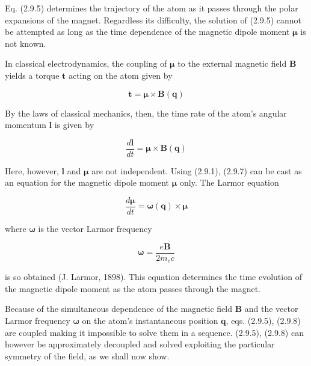 \documentclass{article}
\begin{document}
Eq. (2.9.5) determines the trajectory of the atom as it passes through the polar expansions of the magnet. Regardless its difficulty, the solution of (2.9.5) cannot be attempted as long as the time dependence of the magnetic dipole moment $\boldsymbol{\mu}$ is not known.

In classical electrodynamics, the coupling of $\boldsymbol{\mu}$ to the external magnetic field
$\boldsymbol{B}$ yields a torque $\boldsymbol{t}$ acting on the atom given by
 
\begin{equation*}
\boldsymbol{t}=\boldsymbol{\mu} \times \boldsymbol{B}(\boldsymbol{q}) \tag{2.9.6}
\end{equation*}
 

By the laws of classical mechanics, then, the time rate of the atom's angular momentum $\boldsymbol{l}$ is given by
 
\begin{equation*}
\frac{d \boldsymbol{l}}{d t}=\boldsymbol{\mu} \times \boldsymbol{B}(\boldsymbol{q}) \tag{2.9.7}
\end{equation*}
 

Here, however, $\boldsymbol{l}$ and $\boldsymbol{\mu}$ are not independent. Using (2.9.1), (2.9.7) can be cast as an equation for the magnetic dipole moment $\boldsymbol{\mu}$ only. The Larmor equation
 
\begin{equation*}
\frac{d \boldsymbol{\mu}}{d t}=\boldsymbol{\omega}(\boldsymbol{q}) \times \boldsymbol{\mu} \tag{2.9.8}
\end{equation*}
 
where $\boldsymbol{\omega}$ is the vector Larmor frequency
 
\begin{equation*}
\boldsymbol{\omega}=\frac{e \boldsymbol{B}}{2 m_{e} c} \tag{2.9.9}
\end{equation*}
 
is so obtained (J. Larmor, 1898). This equation determines the time evolution of the magnetic dipole moment as the atom passes through the magnet.

Because of the simultaneous dependence of the magnetic field $\boldsymbol{B}$ and the vector Larmor frequency $\boldsymbol{\omega}$ on the atom's instantaneous position $\boldsymbol{q}$, eqs. (2.9.5), (2.9.8) are coupled making it impossible to solve them in a sequence. (2.9.5), (2.9.8) can however be approximately decoupled and solved exploiting the particular symmetry of the field, as we shall now show.
\end{document}
